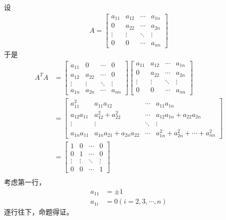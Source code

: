 \documentclass{article}
\begin{document}
设
\begin{align*}
  A = \begin{bmatrix}
        a_{11} & a_{12} & \cdots & a_{1n} \\
        0      & a_{22} & \cdots & a_{2n} \\
        \vdots & \vdots & \ddots & \vdots \\
        0      & 0      & \cdots & a_{nn}
      \end{bmatrix}
\end{align*}
于是
\begin{align*}
  A^T A & =
  \begin{bmatrix}
    a_{11} & 0      & \cdots & 0      \\
    a_{12} & a_{22} & \cdots & 0      \\
    \vdots & \vdots & \ddots & \vdots \\
    a_{1n} & a_{2n} & \cdots & a_{nn}
  \end{bmatrix}
  \begin{bmatrix}
    a_{11} & a_{12} & \cdots & a_{1n} \\
    0      & a_{22} & \cdots & a_{2n} \\
    \vdots & \vdots & \ddots & \vdots \\
    0      & 0      & \cdots & a_{nn}
  \end{bmatrix}                                                                       \\
        & =   \begin{bmatrix}
                a_{11}^2     & a_{11}a_{12}              & \cdots & a_{11}a_{1n}                            \\
                a_{12}a_{11} & a_{12}^2 + a_{22}^2       & \cdots & a_{12}a_{1n} + a_{22}a_{2n}             \\
                \vdots       & \vdots                    & \ddots & \vdots                                  \\
                a_{1n}a_{11} & a_{1n}a_{21}+a_{2n}a_{22} & \cdots & a_{1n}^2 + a_{2n}^2 + \cdots + a_{nn}^2
              \end{bmatrix} \\
        & = \begin{bmatrix}
              1      & 0      & \cdots & 0      \\
              0      & 1      & \cdots & 0      \\
              \vdots & \vdots & \ddots & \vdots \\
              0      & 0      & \cdots & 1
            \end{bmatrix}                                                             \\
\end{align*}
考虑第一行，
\begin{align*}
  a_{11} & = \pm 1                   \\
  a_{1i} & = 0 (i = 2, 3, \cdots, n)
\end{align*}
逐行往下，命题得证。
\end{document}
